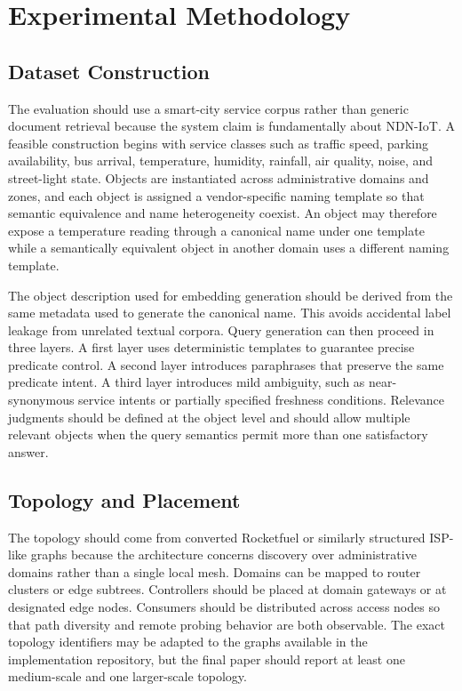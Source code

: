 \documentclass[journal]{IEEEtran}
\begin{document}
\section{Experimental Methodology}

\subsection{Dataset Construction}

The evaluation should use a smart-city service corpus rather than generic document retrieval because the system claim is fundamentally about NDN-IoT. A feasible construction begins with service classes such as traffic speed, parking availability, bus arrival, temperature, humidity, rainfall, air quality, noise, and street-light state. Objects are instantiated across administrative domains and zones, and each object is assigned a vendor-specific naming template so that semantic equivalence and name heterogeneity coexist. An object may therefore expose a temperature reading through a canonical name under one template while a semantically equivalent object in another domain uses a different naming template.

The object description used for embedding generation should be derived from the same metadata used to generate the canonical name. This avoids accidental label leakage from unrelated textual corpora. Query generation can then proceed in three layers. A first layer uses deterministic templates to guarantee precise predicate control. A second layer introduces paraphrases that preserve the same predicate intent. A third layer introduces mild ambiguity, such as near-synonymous service intents or partially specified freshness conditions. Relevance judgments should be defined at the object level and should allow multiple relevant objects when the query semantics permit more than one satisfactory answer.

\subsection{Topology and Placement}

The topology should come from converted Rocketfuel or similarly structured ISP-like graphs because the architecture concerns discovery over administrative domains rather than a single local mesh. Domains can be mapped to router clusters or edge subtrees. Controllers should be placed at domain gateways or at designated edge nodes. Consumers should be distributed across access nodes so that path diversity and remote probing behavior are both observable. The exact topology identifiers may be adapted to the graphs available in the implementation repository, but the final paper should report at least one medium-scale and one larger-scale topology.
\end{document}
